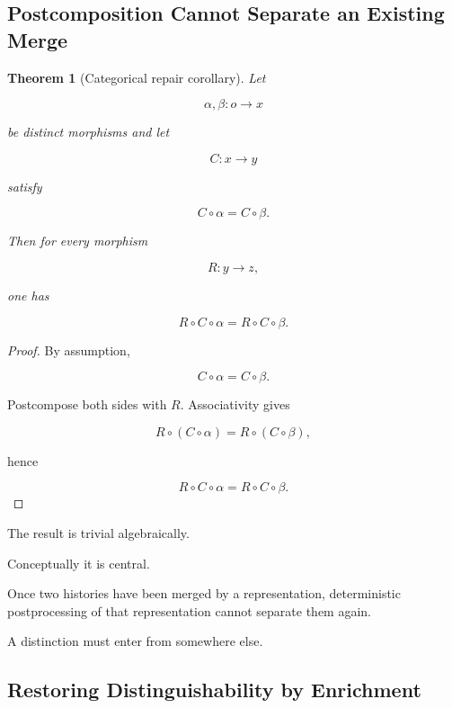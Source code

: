 \documentclass[
  11pt,
  a4paper,
  DIV=12,
  BCOR=0mm,
  parskip=half-
]{scrartcl}
\theoremstyle{definition}
\theoremstyle{plain}
\newtheorem{theorem}[definition]{Theorem}
\theoremstyle{remark}
\begin{document}
\subsection{Postcomposition Cannot Separate an Existing Merge}
\label{app:postcomposition-merge}

\begin{theorem}[Categorical repair corollary]
\label{thm:categorical-repair}
Let

\[
  \alpha,\beta:o\to x
\]

be distinct morphisms and let

\[
  C:x\to y
\]

satisfy

\[
  C\circ\alpha=C\circ\beta.
\]

Then for every morphism

\[
  R:y\to z,
\]

one has

\[
  R\circ C\circ\alpha
  =
  R\circ C\circ\beta.
\]
\end{theorem}

\begin{proof}
By assumption,

\[
  C\circ\alpha=C\circ\beta.
\]

Postcompose both sides with \(R\). Associativity gives

\[
  R\circ(C\circ\alpha)
  =
  R\circ(C\circ\beta),
\]

hence

\[
  R\circ C\circ\alpha
  =
  R\circ C\circ\beta.
\]
\end{proof}

The result is trivial algebraically.

Conceptually it is central.

Once two histories have been merged by a representation, deterministic
postprocessing of that representation cannot separate them again.

A distinction must enter from somewhere else.


\subsection{Restoring Distinguishability by Enrichment}
\label{app:categorical-side-information}
\end{document}
